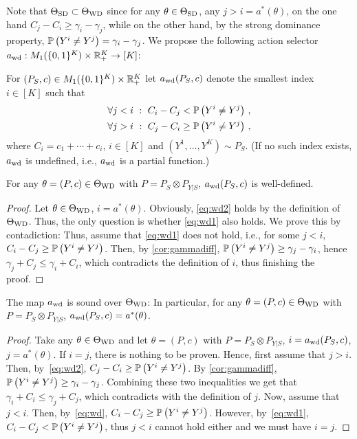 Note that $\Theta_{\mathrm{SD}}\subset \Theta_{\mathrm{WD}}$ since for any $\theta\in \Theta_{\mathrm{SD}}$, any $j>i = a^*(\theta)$, on the one hand $C_j - C_i \ge \gamma_i - \gamma_j$, while on the other hand, by the strong dominance property, $\mathbb{P}\left(Y^i\ne Y^j\right) = \gamma_i - \gamma_j$.
We propose the following action selector $a_{\mathrm{wd}}: M_1(\{0,1\}^K) \times \mathbb{R}_+^K \to [K]$:
\begin{defi}\label{def:awd}
For $(P_S,c) \in M_1(\{0,1\}^K) \times \mathbb{R}_+^K$ let $a_{\mathrm{wd}}(P_S,c)$ denote the smallest index $i\in [K]$ such that
\begin{subequations}
\begin{align}
\forall j<i \,\,:\,\, C_i - C_j < \mathbb{P}\left( Y^i \ne Y^j \right)\,, \label{eq:wd1}\\ 
\forall j>i \,\,:\,\, C_j - C_i \ge \mathbb{P}\left( Y^i \ne Y^j \right)\,, \label{eq:wd2}
\end{align}
\end{subequations}
where $C_i = c_1+\cdots + c_i$, $i\in [K]$ and $(Y^1,\dots,Y^K) \sim P_S$.
(If no such index exists, $a_{\mathrm{wd}}$ is undefined, i.e., $a_{\mathrm{wd}}$ is a partial function.)
\end{defi}
\begin{prop}
\label{prop:awdwelldef}
For any $\theta = (P,c)\in \Theta_{\mathrm{WD}}$ with $P = P_S\otimes P_{Y|S}$, $a_{\mathrm{wd}}(P_S,c)$ is well-defined.
\end{prop}
\begin{proof}
Let $\theta\in \Theta_{\mathrm{WD}}$, $i = a^*(\theta)$. Obviously, \eqref{eq:wd2} holds by the definition of $\Theta_{\mathrm{WD}}$.
Thus, the only question is whether \eqref{eq:wd1} also holds.
We prove this by contadiction:
Thus, assume that \eqref{eq:wd1} does not hold, i.e., for some $j<i$, $C_i-C_j \ge \mathbb{P}\left(Y^i \ne Y^j\right)$. Then, by \cref{cor:gammadiff}, $\mathbb{P}\left( Y^i \ne Y^j\right) \ge \gamma_j - \gamma_i$, hence $\gamma_j + C_j \le \gamma_i + C_i$, which contradicts the definition of $i$, thus finishing the proof.
\end{proof}
\begin{prop}
\label{prop:awdsound}
The map $a_{\mathrm{wd}}$ is sound over $\Theta_{\mathrm{WD}}$: In particular, for any
$\theta = (P,c)\in \Theta_{\mathrm{WD}}$ with $P = P_S\otimes P_{Y|S}$, $a_{\mathrm{wd}}(P_S,c)= a^*(\theta)$.
\end{prop}
\begin{proof}
Take any $\theta\in \Theta_{\mathrm{WD}}$ and let $\theta = (P,c)$ with $P = P_S\otimes P_{Y|S}$, $i = a_{\mathrm{wd}}(P_S,c)$, $j = a^*(\theta)$.
If $i=j$, there is nothing to be proven. Hence, first assume that $j>i$. Then, by~\eqref{eq:wd2}, $C_j - C_i \ge \mathbb{P}\left(Y^i \ne Y^j\right)$.
By \cref{cor:gammadiff}, $\mathbb{P}\left(Y^i \ne Y^j \right) \ge \gamma_i - \gamma_j$. Combining these two inequalities we get that
$\gamma_i + C_i \le \gamma_j + C_j$, which contradicts with the definition of $j$.
Now, assume that $j<i$. Then, by~\eqref{eq:wd}, $C_i - C_j \ge \mathbb{P}\left(Y^i \ne Y^j\right)$.
However, by~\eqref{eq:wd1}, $C_i -C_j < \mathbb{P}\left(Y^i \ne Y^j\right)$, thus $j<i$ cannot hold either and we must have $i=j$.
\end{proof}
